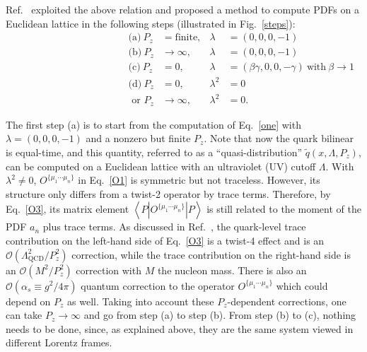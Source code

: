 Ref.~\cite{Ji:2013dva} exploited the above relation and proposed a method to
compute PDFs on a Euclidean lattice in the following steps (illustrated in Fig.~\ref{steps}):
%
\begin{align}
\label{eq:steps}
\hspace{2in}\text{(a)}\ P_z &=\text{finite},&   \lambda&=(0,0,0,-1)  \hspace{2in}\nonumber\\
\hspace{2in}\text{(b)}\ P_z &\rightarrow \infty,&   \lambda&=(0,0,0,-1) \hspace{2in}\nonumber\\
\hspace{2in}\text{(c)}\ P_z &=0,&   \lambda&=(\beta\gamma,0,0,-\gamma)  \ \text{with}\  \beta\to 1\nonumber\hspace{2in}\\
\hspace{2in}\text{(d)}\ P_z &=0,&  \lambda^2&=0 \hspace{2in}\nonumber\\
\hspace{2in}\mbox{ or }P_z &\rightarrow\infty,& \lambda^2&=0. \hspace{2in}
\end{align}

The first step (a) is to start from the computation of Eq.~\ref{one}
with $\lambda=(0,0,0,-1)$ and a nonzero but finite $P_z$. Note
that now the quark bilinear is equal-time, and this quantity, referred to as a
``quasi-distribution'' $\tilde{q}(x,\Lambda ,P_z)$, 
can be computed on a Euclidean lattice with an ultraviolet (UV) cutoff $\Lambda$.
With $\lambda^2 \neq 0$, $O^{\{\mu_1\cdots \mu_n\}}$ in Eq.~\ref{O1} is symmetric
but not traceless. However, its structure only differs from a twist-2 operator
by trace terms. Therefore, by Eq.~\ref{O3}, its matrix element
$\left\langle P\left\vert O^{\{\mu_1\cdots \mu_n\}}\right\vert P\right\rangle$
is still related to the moment of the PDF $a_n$ plus trace terms. As discussed in
Ref.~\cite{Ji:2013dva}, the quark-level trace contribution on the left-hand
side of Eq.~\ref{O3} is a twist-4 effect and is an
$\mathcal{O}(\Lambda_\text{QCD}^2/P_z^2)$ correction, while the trace
contribution on the right-hand side is an $\mathcal{O}(M^2/P_z^2)$ correction
with $M$ the nucleon mass. There is also an $\mathcal{O}(\alpha_s\equiv g^2/4\pi)$
quantum correction to the operator $O^{\{\mu_1\cdots \mu_n\}}$ which
could depend on $P_z$ as well. Taking into account these $P_z$-dependent
corrections, one can take $P_z\rightarrow \infty$ and go from step
(a) to step (b). From step (b) to (c), nothing needs to be done, since, as explained above, they are the same system viewed in different Lorentz frames.

